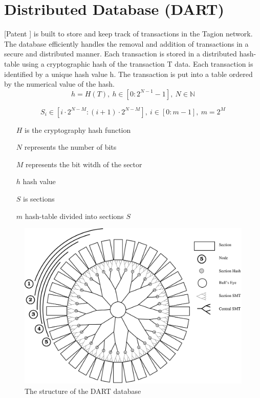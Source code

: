 \section{Distributed Database (DART)}\label{sec:DART}

 [Patent \cite{dart_patent}]
 is built to store and keep track of transactions in the Tagion network. The database efficiently handles the removal and addition of transactions in a secure and distributed manner.
Each transaction is stored in a distributed hash-table using a cryptographic hash of the transaction T data. Each transaction is identified by a unique hash value h. The transaction is put into a table ordered by the numerical value of the hash.
\begin{equation}
 h = H(T), ~ h \in [0:2^{N-1}-1], ~ N \in \mathbb{N}
\end{equation}

\begin{equation}
  S_i \in [i \cdot 2^{N-M}:(i+1) \cdot 2^{N-M}], ~ i \in [0:m-1], ~ m = 2^M
\end{equation}


\begin{itemize}
 \item[$H$] is the cryptography hash function
 \item[$N$] represents the number of bits
 \item[$M$] represents the bit witdh of the sector
 \item[$h$]  hash value
 \item[$S$]  is sections
 \item[$m$]  hash-table divided into sections $S$
\end{itemize}

\begin{figure}[H]
 \centering
 \includegraphics[width=1.0\textwidth]{fig/dart_bw.eps}
 \caption{The structure of the DART database}
 \label{fig:dart}
\end{figure}


